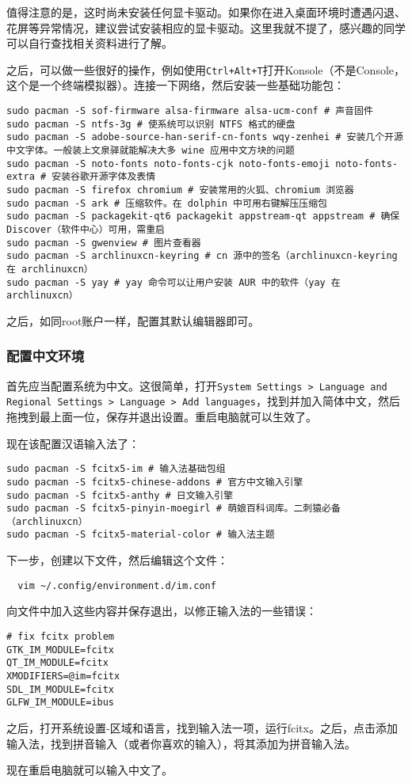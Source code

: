 \documentclass[../main.tex]{subfiles}
\begin{document}
值得注意的是，这时尚未安装任何显卡驱动。如果你在进入桌面环境时遭遇闪退、花屏等异常情况，建议尝试安装相应的显卡驱动。这里我就不提了，感兴趣的同学可以自行查找相关资料进行了解。

之后，可以做一些很好的操作，例如使用\texttt{Ctrl+Alt+T}打开Konsole（不是Console，这个是一个终端模拟器）。连接一下网络，然后安装一些基础功能包：
\begin{lstlisting}
sudo pacman -S sof-firmware alsa-firmware alsa-ucm-conf # 声音固件
sudo pacman -S ntfs-3g # 使系统可以识别 NTFS 格式的硬盘
sudo pacman -S adobe-source-han-serif-cn-fonts wqy-zenhei # 安装几个开源中文字体。一般装上文泉驿就能解决大多 wine 应用中文方块的问题
sudo pacman -S noto-fonts noto-fonts-cjk noto-fonts-emoji noto-fonts-extra # 安装谷歌开源字体及表情
sudo pacman -S firefox chromium # 安装常用的火狐、chromium 浏览器
sudo pacman -S ark # 压缩软件。在 dolphin 中可用右键解压压缩包
sudo pacman -S packagekit-qt6 packagekit appstream-qt appstream # 确保 Discover（软件中心）可用，需重启
sudo pacman -S gwenview # 图片查看器
sudo pacman -S archlinuxcn-keyring # cn 源中的签名（archlinuxcn-keyring 在 archlinuxcn）
sudo pacman -S yay # yay 命令可以让用户安装 AUR 中的软件（yay 在 archlinuxcn）
\end{lstlisting}

之后，如同root账户一样，配置其默认编辑器即可。

\subsubsection{配置中文环境}

首先应当配置系统为中文。这很简单，打开\texttt{System Settings > Language and Regional Settings > Language > Add languages}，找到并加入简体中文，然后拖拽到最上面一位，保存并退出设置。重启电脑就可以生效了。

现在该配置汉语输入法了：
\begin{lstlisting}
sudo pacman -S fcitx5-im # 输入法基础包组
sudo pacman -S fcitx5-chinese-addons # 官方中文输入引擎
sudo pacman -S fcitx5-anthy # 日文输入引擎
sudo pacman -S fcitx5-pinyin-moegirl # 萌娘百科词库。二刺猿必备（archlinuxcn）
sudo pacman -S fcitx5-material-color # 输入法主题
\end{lstlisting}
下一步，创建以下文件，然后编辑这个文件：
\begin{lstlisting}
  vim ~/.config/environment.d/im.conf
\end{lstlisting}
向文件中加入这些内容并保存退出，以修正输入法的一些错误：
\begin{lstlisting}
# fix fcitx problem
GTK_IM_MODULE=fcitx
QT_IM_MODULE=fcitx
XMODIFIERS=@im=fcitx
SDL_IM_MODULE=fcitx
GLFW_IM_MODULE=ibus
\end{lstlisting}
之后，打开系统设置-区域和语言，找到输入法一项，运行fcitx。之后，点击添加输入法，找到拼音输入（或者你喜欢的输入），将其添加为拼音输入法。

现在重启电脑就可以输入中文了。
\end{document}
